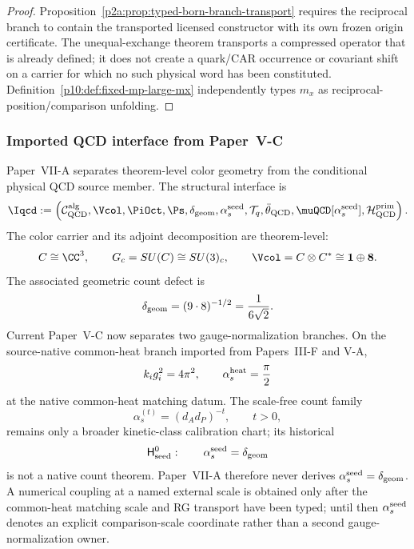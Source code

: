 \documentclass[12pt,a4paper]{article}
\providecommand{\deltageom}{\delta_{\rm geom}}
\providecommand{\alphasseed}{\alpha_s^{\rm seed}}
\providecommand{\Hseedzero}{\mathsf H_{\rm seed}^{0}}
\begin{document}
\begin{proof}
Proposition~\ref{p2a:prop:typed-born-branch-transport} requires the reciprocal
branch to contain the transported licensed constructor with its own frozen
origin certificate.  The unequal-exchange theorem transports a compressed
operator that is already defined; it does not create a quark/CAR occurrence or
covariant shift on a carrier for which no such physical word has been
constituted.  Definition~\ref{p10:def:fixed-mp-large-mx} independently types
$m_x$ as reciprocal-position/comparison unfolding.
\end{proof}

\subsubsection{Imported QCD interface from Paper~V-C}
\label{p10:sec:imported-interface}

Paper~VII-A separates theorem-level color geometry from the conditional physical QCD source member.  The structural interface is
\begin{equation}
\label{p10:eq:imported-qcd-interface}
\Iqcd:=\left(\mathcal C_{\rm QCD}^{\rm alg},\Vcol,\PiOct,\Ps,\deltageom,\alphasseed,\mathcal T_q,\bar\theta_{\rm QCD},\muQCD[\alphasseed],\mathcal H_{\rm QCD}^{\rm prim}\right).
\end{equation}
The color carrier and its adjoint decomposition are theorem-level:
\begin{equation}
\label{p10:eq:color-pair-import}
C\cong\CC^3,\qquad G_c=SU(C)\cong SU(3)_c,\qquad
\Vcol=C\otimes C^\ast\cong\mathbf1\oplus\mathbf8.
\end{equation}
The associated geometric count defect is
\begin{equation}
\label{p10:eq:strong-pivot-import}
\deltageom=(9\cdot8)^{-1/2}=\frac1{6\sqrt2}.
\end{equation}
Current Paper~V-C now separates two gauge-normalization branches.  On the
source-native common-heat branch imported from Papers~III-F and V-A,
\begin{equation}
\label{p10:eq:qcd-heat-source-branch}
 k_i g_i^2=4\pi^2,
 \qquad
 \alpha_s^{\rm heat}=\frac\pi2
\end{equation}
at the native common-heat matching datum.  The scale-free count family
\begin{equation}
 \alpha_s^{(t)}=(d_A d_P)^{-t},\qquad t>0,
\end{equation}
remains only a broader kinetic-class calibration chart; its historical
\begin{equation}
\label{p10:eq:qcd-source-branch}
\Hseedzero:\qquad \alphasseed=\deltageom
\end{equation}
is not a native count theorem.  Paper~VII-A therefore never derives
\(\alphasseed=\deltageom\).  A numerical coupling at a named external scale is
obtained only after the common-heat matching scale and RG transport have been
typed; until then \(\alphasseed\) denotes an explicit comparison-scale
coordinate rather than a second gauge-normalization owner.
\end{document}
